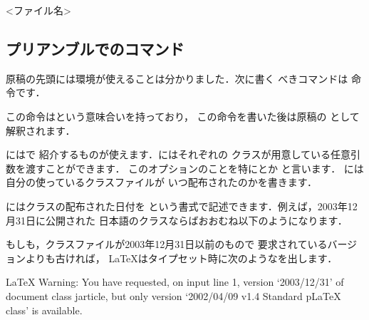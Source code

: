 {{{{{\begin{InTeX}
\begin{filecontents*}{<ファイル名>}
\end{filecontents*}
\end{InTeX}


\subsection{プリアンブルでのコマンド}
原稿の先頭には環境が使えることは分かりました．次に書く
べきコマンドは  命令です．
\begin{Syntax}
\end{Syntax}
この命令はという意味合いを持っており，
この命令を書いた後は原稿の
として解釈されます．

にはで
紹介するものが使えます．にはそれぞれの
クラスが用意している任意引数を渡すことができます．
このオプションのことを特にとか%
%
%
と言います．
には自分の使っているクラスファイルが
いつ配布されたのかを書きます．

にはクラスの配布された日付を
という書式で記述できます．例えば，2003年12月31日に公開された
日本語のクラスならばおおむね以下のようになります．


もしも，クラスファイルが2003年12月31日以前のもので
要求されているバージョンよりも古ければ，
{\LaTeX}はタイプセット時に次のようなを出します．

%
%
\begin{OutTerm}
LaTeX Warning: You have requested, on input line 1, version
               `2003/12/31' of document class jarticle,
               but only version
               `2002/04/09 v1.4 Standard pLaTeX class'
               is available.
\end{OutTerm}

}}}}}
